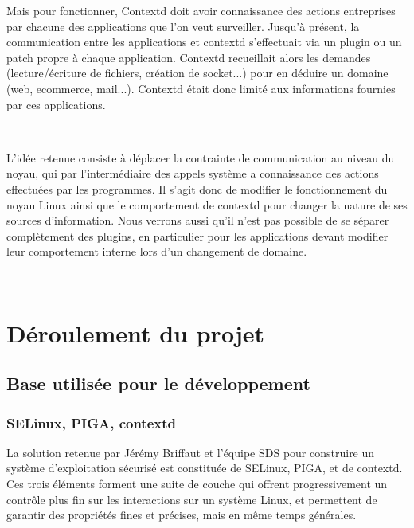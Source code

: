 \documentclass[pdftex,a4paper,titlepage,11pt]{article}
\begin{document}
Mais pour fonctionner, Contextd doit avoir connaissance des actions entreprises par chacune des applications que l'on veut surveiller. Jusqu'à présent, la communication entre les applications et contextd s'effectuait via un plugin ou un patch propre à chaque application. Contextd recueillait alors les demandes (lecture/écriture de fichiers, création de socket...) pour en déduire un domaine (web, ecommerce, mail...). Contextd était donc limité aux informations fournies par ces applications.

~

L'idée retenue consiste à déplacer la contrainte de communication au niveau du noyau, qui par l'intermédiaire des appels système a connaissance des actions effectuées par les programmes. Il s'agit donc de modifier le fonctionnement du noyau Linux ainsi que le comportement de contextd pour changer la nature de ses sources d'information. Nous verrons aussi qu'il n'est pas possible de se séparer complètement des plugins, en particulier pour les applications devant modifier leur comportement interne lors d'un changement de domaine.

~

\newpage



\newpage

\section{Déroulement du projet}

\subsection{Base utilisée pour le développement}


\subsubsection{SELinux, PIGA, contextd}

La solution retenue par Jérémy Briffaut et l'équipe SDS pour construire un système d'exploitation sécurisé est constituée de SELinux, PIGA, et de contextd. Ces trois éléments forment une suite de couche qui offrent progressivement un contrôle plus fin sur les interactions sur un système Linux, et permettent de garantir des propriétés fines et précises, mais en même temps générales.
\end{document}
